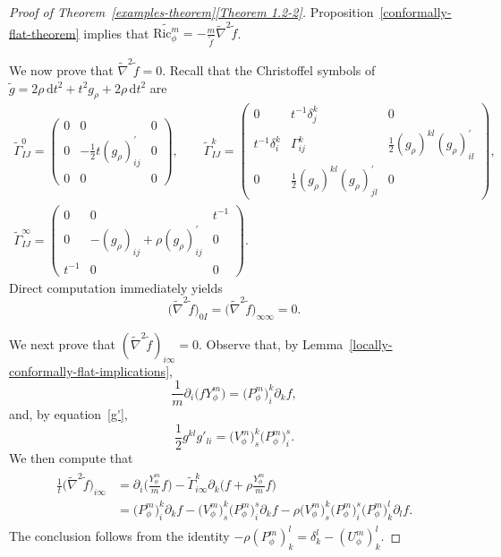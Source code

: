 \documentclass[pdftex]{sigma}
\numberwithin{equation}{section}
\begin{document}
\begin{proof}[Proof of Theorem~\ref{examples-theorem}\ref{Theorem 1.2-2}]
 Proposition~\ref{conformally-flat-theorem} implies that $\widetilde{\mathrm{Ric}_\phi^m}=-\frac{m}{\widetilde{f}}\widetilde{\nabla}^2 \widetilde{f}$.

We now prove that $\widetilde{\nabla}^2 \widetilde{f}=0$. Recall \cite[equation~(3.16)]{FeffermanGraham2012} that the Christoffel symbols of $\widetilde{g}=2\rho\, \mathrm{d}t^2+t^2 g_\rho+2\rho\, \mathrm{d}t^2$ are
\begin{gather}
\widetilde{\Gamma}_{I J}^{0}=\begin{pmatrix}
0 & 0 & 0 \\
0 & -\frac{1}{2} t (g_\rho)_{i j}^{\prime} & 0 \\
0 & 0 & 0
\end{pmatrix}\!, \qquad
\widetilde{\Gamma}_{I J}^{k}=\begin{pmatrix}
0 & t^{-1} \delta_{j}^{k} & 0 \\
t^{-1} \delta_{i}^{k} & \Gamma_{i j}^{k} & \frac{1}{2} (g_\rho)^{k l} (g_\rho)_{i l}^{\prime} \\
0 & \frac{1}{2} (g_\rho)^{k l} (g_\rho)_{j l}^{\prime} & 0
\end{pmatrix}\!, \nonumber
\\
\widetilde{\Gamma}_{I J}^{\infty}=\begin{pmatrix}
0 & 0 & t^{-1} \\
0 & -(g_\rho)_{i j}+\rho (g_\rho)_{i j}^{\prime} & 0 \\
t^{-1} & 0 & 0
\end{pmatrix}\!.
\label{christoffel-weighted-normal-straight}
\end{gather}
Direct computation immediately yields
\[
\big(\widetilde{\nabla}^2 \widetilde{f}\big)_{0 I}=\big(\widetilde{\nabla}^2 \widetilde{f}\big)_{\infty\infty}=0.
\]

We next prove that $(\widetilde{\nabla}^2\widetilde{f})_{i\infty}=0$. Observe that, by Lemma~\ref{locally-conformally-flat-implications},
\begin{equation}\label{fyphim}
\frac{1}{m}\partial_i \big(fY_\phi^m\big)=\big(P_\phi^m\big)_i^k \partial_k f,
\end{equation}
and, by equation~\eqref{g'},
\[
\frac{1}{2}g^{kl}g'_{li}=\big(V_\phi^m\big)^k_s \big(P_\phi^m\big)^s_i.
\]
We then compute that{\samepage
\begin{gather*}
\begin{split}
\frac{1}{t}\big(\widetilde{\nabla}^2 \widetilde{f}\big)_{i\infty}&=\partial_i \biggl(\frac{Y_\phi^m}{m}f\biggr)-\widetilde{\Gamma}_{i\infty}^k \partial_k\biggl(f+\rho \frac{Y_\phi^m}{m}f\biggr)\\
&=\big(P_\phi^m\big)^k_i \partial_k f-\big(V_\phi^m\big)^k_s\big(P_\phi^m\big)^s_i\partial_k f-\rho\big(V_\phi^m\big)^k_s \big(P_\phi^m\big)^s_i \big(P_\phi^m\big)^l_k \partial_l f.
\end{split}
\end{gather*}
The conclusion follows from the identity $-\rho (P_\phi^m)^l_k=\delta^l_k-(U_\phi^m)^l_k$.}


\end{proof}
\end{document}
